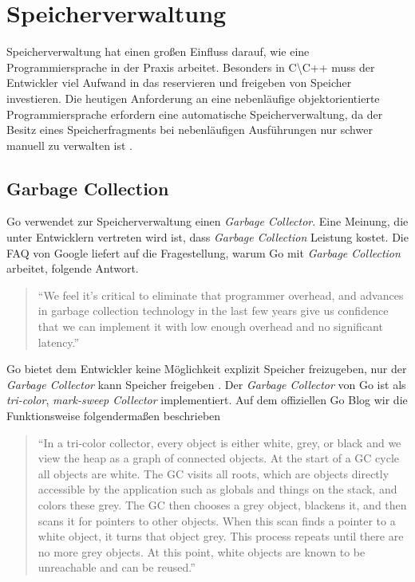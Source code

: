 \chapter{Speicherverwaltung}
Speicherverwaltung hat einen großen Einfluss darauf, wie eine Programmiersprache in der Praxis arbeitet. 
Besonders in C{\textbackslash}C++ muss der Entwickler viel Aufwand in das reservieren und freigeben von Speicher investieren.
Die heutigen Anforderung an eine nebenläufige objektorientierte Programmiersprache erfordern eine automatische Speicherverwaltung, da der Besitz eines Speicherfragments bei nebenläufigen Ausführungen nur schwer manuell zu verwalten ist \cite{RobPike.2012}.

\section{Garbage Collection}
Go verwendet zur Speicherverwaltung einen \textit{Garbage Collector}. 
Eine Meinung, die unter Entwicklern vertreten wird ist, dass \textit{Garbage Collection} Leistung kostet. 
Die FAQ von Google liefert auf die Fragestellung, warum Go mit \textit{Garbage Collection} arbeitet, folgende Antwort.

\begin{quote}
\enquote{We feel it's critical to eliminate that programmer overhead, and advances in garbage collection technology in the last few years give us confidence that we can implement it with low enough overhead and no significant latency.}\cite{Golang.FAQ}
\end{quote}

Go bietet dem Entwickler keine Möglichkeit explizit Speicher freizugeben, nur der \textit{Garbage Collector} kann Speicher freigeben \cite{RobPike.2012}.
Der \textit{Garbage Collector} von Go ist als \textit{tri-color}, \textit{mark-sweep Collector} implementiert.
Auf dem offiziellen Go Blog wir die Funktionsweise folgendermaßen beschrieben

\begin{quote}
\enquote{In a tri-color collector, every object is either white, grey, or black and we view the heap as a graph of connected objects. At the start of a GC cycle all objects are white. The GC visits all roots, which are objects directly accessible by the application such as globals and things on the stack, and colors these grey. The GC then chooses a grey object, blackens it, and then scans it for pointers to other objects. When this scan finds a pointer to a white object, it turns that object grey. This process repeats until there are no more grey objects. At this point, white objects are known to be unreachable and can be reused.} \cite{Go.GC}
\end{quote}

